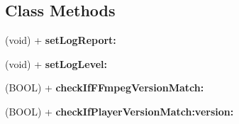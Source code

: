 \subsection*{Class Methods}
\begin{DoxyCompactItemize}
\item 
\mbox{\label{interface_i_j_k_f_f_movie_player_controller_af5213a13ca0bd8dd13a81ee4764e8408}} 
(void) + {\bfseries set\+Log\+Report\+:}
\item 
\mbox{\label{interface_i_j_k_f_f_movie_player_controller_a8fee9accc00e7593232174e0318a939a}} 
(void) + {\bfseries set\+Log\+Level\+:}
\item 
\mbox{\label{interface_i_j_k_f_f_movie_player_controller_a2005c70e9ba3b7c41e499159b79d58dd}} 
(B\+O\+OL) + {\bfseries check\+If\+F\+Fmpeg\+Version\+Match\+:}
\item 
\mbox{\label{interface_i_j_k_f_f_movie_player_controller_a78c99551cfce85f475776bfbeaa26d78}} 
(B\+O\+OL) + {\bfseries check\+If\+Player\+Version\+Match\+:version\+:}
\end{DoxyCompactItemize}
